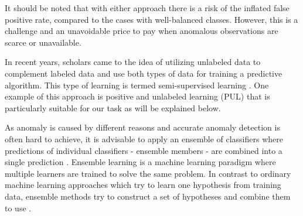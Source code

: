 It should be noted that with either approach there is a risk of the inflated false positive rate, compared to the cases with well-balanced classes. However, this is a challenge and an unavoidable price to pay when anomalous observations are scarce or unavailable.

In recent years, scholars came to the idea of utilizing unlabeled data to complement labeled data and use both types of data for training a predictive algorithm. This type of learning is termed semi-supervised learning \cite{Zhu:2008}. One example of this approach is positive and unlabeled learning (PUL) \cite{Elkan;Noto:2008} that is particularly suitable for our task as will be explained below.

As anomaly is caused by different reasons and accurate anomaly detection is often hard to achieve, it is advisable to apply an ensemble of classifiers where predictions of individual classifiers - ensemble members - are combined into a single prediction \cite{Seni:2010:EMD:1841412}. 
Ensemble learning is a machine learning paradigm where multiple learners are trained to solve the same problem. In contrast
to ordinary machine learning approaches which try to learn one hypothesis from training data, ensemble methods try to
construct a set of hypotheses and combine them to use \cite{Zhou:2012}.




